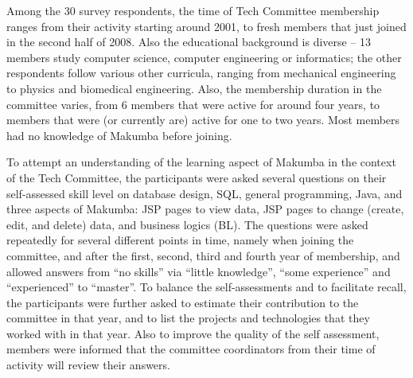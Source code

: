 \documentclass{llncs}
\begin{document}



Among the 30 survey respondents, the 
time of Tech Committee membership ranges from their activity starting around 2001, to fresh members that just joined in the second half of 2008. Also the educational background is diverse -- 13 members study computer science, computer engineering or informatics; the other respondents follow various other curricula, ranging from mechanical engineering to physics and biomedical engineering. Also, the membership duration in the committee varies, from 6 members that were active for around four years, to members that were (or currently are) active for one to two years. Most members had no knowledge of Makumba before joining.

To attempt an understanding of the learning aspect of Makumba in the context of the Tech Committee, the participants were asked several questions on their self-assessed skill level on database design, SQL, general programming, Java, and three aspects of Makumba: JSP pages to view data, JSP pages to change (create, edit, and delete) data, and business logics (BL). The questions were asked repeatedly for several different points in time, namely when joining the committee, and after the first, second, third and fourth year of membership, and allowed answers from ``no skills'' via ``little knowledge'', ``some experience'' and ``experienced'' to ``master''. To balance the self-assessments and to facilitate recall, the participants were further asked to estimate their contribution to the committee in that year, and to list the projects and technologies that they worked with in that year. Also to improve the quality of the self assessment, members were informed that the committee coordinators from their time of activity will review their answers.
\end{document}
